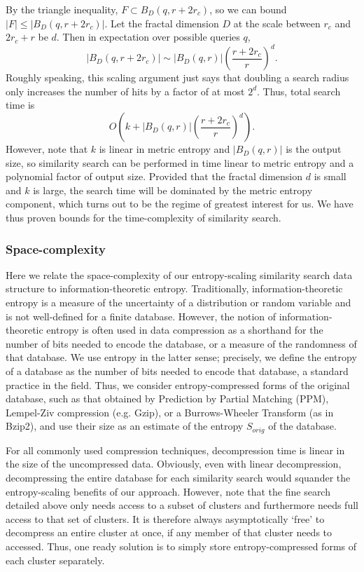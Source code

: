 \documentclass[review,preprint,12pt]{elsarticle}
\theoremstyle{definition}
\theoremstyle{remark}
\begin{document}
By the triangle inequality, $F \subset B_D(q,r+2r_c)$,
so we can bound $|F| \le |B_D(q,r+2r_c)|$.
Let the fractal dimension $D$ at the scale between $r_c$ and $2r_c + r$ be $d$.
Then in expectation over possible queries $q$,
\[
    \left|B_D(q, r+2r_c)\right| \sim \left|B_D(q,r)\right|\left(\frac{r+2r_c}{r}\right)^d .
\]
Roughly speaking, this scaling argument just says that doubling a search radius only increases the number of hits by a factor of at most $2^d$.
Thus, total search time is 
\[
    O\left(k + \left|B_D(q,r)\right|\left(\frac{r+2r_c}{r}\right)^d \right).
\]
However, note that $k$ is linear in metric entropy and $|B_D(q,r)|$ is the output size, so similarity search can be performed in time linear to metric entropy and a polynomial factor of output size.
Provided that the fractal dimension $d$ is small and $k$ is large, the search time will be dominated by the metric entropy component, which turns out to be the regime of greatest interest for us.
We have thus proven bounds for the time-complexity of similarity search.

\subsubsection{Space-complexity}
Here we relate the space-complexity of our entropy-scaling similarity search data structure to information-theoretic entropy.
Traditionally, information-theoretic entropy is a measure of the uncertainty of a distribution or random variable and is not well-defined for a finite database.
However, the notion of information-theoretic entropy is often used in data compression as a shorthand for the number of bits needed to encode the database, or a measure of the randomness of that database.
We use entropy in the latter sense; precisely, we define the entropy of a database as the number of bits needed to encode that database, a standard practice in the field.
Thus, we consider entropy-compressed forms of the original database, such as that obtained by Prediction by Partial Matching (PPM), Lempel-Ziv compression (e.g. Gzip), or a Burrows-Wheeler Transform (as in Bzip2), and use their size as an estimate of the entropy $S_{orig}$ of the database.

For all commonly used compression techniques, decompression time is linear in the size of the uncompressed data.
Obviously, even with linear decompression, decompressing the entire database for each similarity search would squander the entropy-scaling benefits of our
approach.
However, note that the fine search detailed above only needs access to a subset of clusters and furthermore needs full access to that set of clusters.
It is therefore always asymptotically `free' to decompress an entire cluster at once, if any member of that cluster needs to accessed.
Thus, one ready solution is to simply store entropy-compressed forms of each cluster separately.
\end{document}
